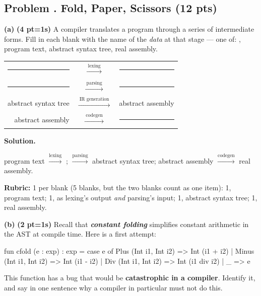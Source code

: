 \documentclass[crop=false]{standalone}
\newif\ifsol
\newenvironment{solution}
    {\par\color{solution_color}\begin{framed}\textbf{Solution.}\par}
    {\end{framed}}
\newcommand{\term}[1]{\textbf{\textit{#1}}}
\newcommand{\quizproblem}[3]{%
  \needspace{5\baselineskip}%
  \stepcounter{problem}%
  \ifsol
    \subsection*{Problem \arabic{problem}. #1 \hfill \timing{#2} \quad (#3 pts)}%
  \else
    \subsection*{Problem \arabic{problem}. #1 \hfill (#3 pts)}%
  \fi
}
\newcommand{\subpts}[1]{\textbf{(#1 pt\ifnum#1=1\else s\fi)}}
\newcommand{\answerspace}[1]{\ifsol\else\vspace{#1}\par\fi}
\begin{document}
\quizproblem{Fold, Paper, Scissors}{13}{12}

\textbf{(a)} \subpts{4} A compiler translates a program through a series
of intermediate forms. Fill in each blank with the name of the
\emph{data} at that stage --- one of: , program text,
abstract syntax tree, real assembly.

\begin{center}
\begin{tabular}{rcl}
  \rule{4cm}{0.4pt} & $\xrightarrow{\ \text{lexing}\ }$ & \rule{4cm}{0.4pt} \\[14pt]
  \rule{4cm}{0.4pt} & $\xrightarrow{\ \text{parsing}\ }$ & \rule{4cm}{0.4pt} \\[14pt]
  abstract syntax tree & $\xrightarrow{\ \text{IR generation}\ }$ & abstract assembly \\[14pt]
  abstract assembly & $\xrightarrow{\ \text{codegen}\ }$ & \rule{4cm}{0.4pt} \\
\end{tabular}
\end{center}

\answerspace{1cm}

\begin{solution}
program text $\xrightarrow{\text{lexing}}$ ;
\quad {} $\xrightarrow{\text{parsing}}$ abstract syntax tree;
\quad abstract assembly $\xrightarrow{\text{codegen}}$ real assembly.

\textbf{Rubric:} 1 per blank (5 blanks, but the two 
blanks count as one item): 1, program text; 1,  as
lexing's output \emph{and} parsing's input; 1, abstract syntax tree;
1, real assembly.
\end{solution}

\textbf{(b)} \subpts{2} Recall that \term{constant folding} simplifies
constant arithmetic in the AST at compile time. Here is a first attempt:

\begin{codeblock}
  fun cfold (e : exp) : exp =
    case e of
      Plus  (Int i1, Int i2) => Int (i1 + i2)
    | Minus (Int i1, Int i2) => Int (i1 - i2)
    | Div   (Int i1, Int i2) => Int (i1 div i2)
    | _ => e
\end{codeblock}

This function has a bug that would be \textbf{catastrophic in a
compiler}. Identify it, and say in one sentence why a compiler in
particular must not do this.

\answerspace{3cm}
\end{document}
